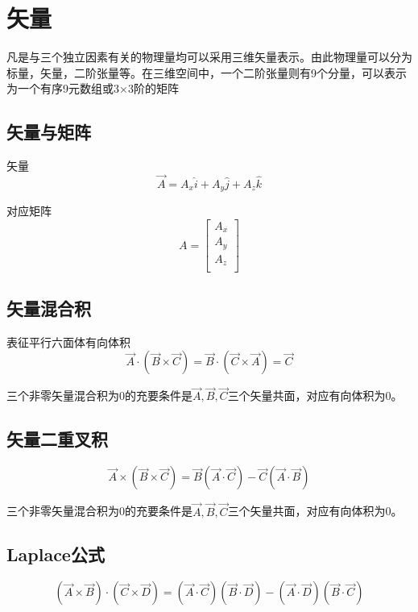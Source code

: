\chapter{矢量}

凡是与三个独立因素有关的物理量均可以采用三维矢量表示。由此物理量可以分为标量，矢量，二阶张量等。在三维空间中，一个二阶张量则有9个分量，可以表示为一个有序9元数组或3×3阶的矩阵


\section{矢量与矩阵}

矢量
\[\vec{A}=A_x\widehat{i}+A_y\widehat{j}+A_z\widehat{k}\]


\noindent	对应矩阵
\[A=\left[ \begin{array}{c}
A_x\\
A_y\\
A_z\\
\end{array} \right] \]



\section{矢量混合积}
表征平行六面体有向体积
\[
\vec{A}\cdot \left( \vec{B}\times \vec{C} \right) =\vec{B}\cdot \left( \vec{C}\times \vec{A} \right) =\vec{C}
\]

\begin{newdef}[]
	三个非零矢量混合积为0的充要条件是$\vec{A},\vec{B},\vec{C}$三个矢量共面，对应有向体积为0。
\end{newdef}




\section{矢量二重叉积}	
\[
\vec{A}\times \left( \vec{B}\times \vec{C} \right) =\vec{B}\left( \vec{A}\cdot \vec{C} \right) -\vec{C}\left( \vec{A}\cdot \vec{B} \right) 
\]
\begin{newdef}[]
	三个非零矢量混合积为0的充要条件是$\vec{A},\vec{B},\vec{C}$三个矢量共面，对应有向体积为0。
\end{newdef}


\section{Laplace公式}
\[
\left( \vec{A}\times \vec{B} \right) \cdot \left( \vec{C}\times \vec{D} \right) =\left( \vec{A}\cdot \vec{C} \right) \left( \vec{B}\cdot \vec{D} \right) -\left( \vec{A}\cdot \vec{D} \right) \left( \vec{B}\cdot \vec{C} \right) 
\]


